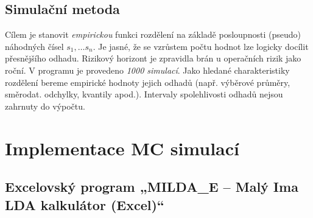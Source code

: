 \documentclass{article}
\begin{document}



\subsection{Simulační metoda}
Cílem je stanovit \emph{empirickou} funkci rozdělení na základě posloupnosti (pseudo) náhodných čísel $s_1, \ldots s_n$. Je jasné, že se vzrůstem počtu hodnot lze logicky docílit přesnějšího odhadu. Rizikový horizont je zpravidla brán u operačních rizik jako roční. V programu je provedeno \emph{1000 simulací}. Jako hledané charakteristiky rozdělení bereme empirické hodnoty jejich odhadů (např. výběrové průměry, směrodat. odchylky, kvantily apod.). Intervaly spolehlivosti odhadů nejsou zahrnuty do výpočtu.



\section{Implementace MC simulací}


\subsection{Excelovský program „MILDA\_E – Malý Ima LDA kalkulátor (Excel)“}
\end{document}
